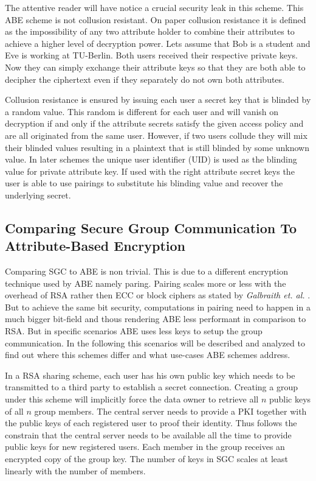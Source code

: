 The attentive reader will have notice a crucial security leak in this scheme. This \ac{ABE} scheme is not collusion resistant. On paper collusion resistance it is defined as the impossibility of any two attribute holder to combine their attributes to achieve a higher level of decryption power. Lets assume that Bob is a student and Eve is working at \ac{TU}-Berlin. Both users received their respective private keys. Now they can simply exchange their attribute keys so that they are both able to decipher the ciphertext even if they separately do not own both attributes.  

Collusion resistance is ensured by issuing each user a secret key that is blinded by a random value. This random is different for each user and will vanish on decryption if and only if the attribute secrets satisfy the given access policy and are all originated from the same user. However, if two users collude they will mix their blinded values resulting in a plaintext that is still blinded by some unknown value. \cite{bethencourt2007ciphertext} In later schemes the unique user identifier (\ac{UID}) is used as the blinding value for private attribute key. \cite{li2017two} If used with the right attribute secret keys the user is able to use pairings to substitute his blinding value and recover the underlying secret. 

\subsection{Comparing Secure Group Communication To Attribute-Based Encryption}
\label{sec:comparing-secure-group-communication-to-attribute-based-encryption}
Comparing \ac{SGC} to \ac{ABE} is non trivial. This is due to a different encryption technique used by \ac{ABE} namely paring. Pairing scales more or less with the overhead of \ac{RSA} rather then \ac{ECC} or block ciphers as stated by \textit{Galbraith et. al.} \cite{galbraith2008pairings}. But to achieve the same bit security, computations in pairing need to happen in a much bigger bit-field and thous rendering \ac{ABE} less performant in comparison to \ac{RSA}. But in specific scenarios \ac{ABE} uses less keys to setup the group communication. In the following this scenarios will be described and analyzed to find out where this schemes differ and what use-cases \ac{ABE} schemes address.

In a \ac{RSA} sharing scheme, each user has his own public key which needs to be transmitted to a third party to establish a secret connection. Creating a group under this scheme will implicitly force the data owner to retrieve all $n$ public keys of all $n$ group members. The central server needs to provide a \ac{PKI} together with the public keys of each registered user to proof their identity. Thus follows the constrain that the central server needs to be available all the time to provide public keys for new registered users. Each member in the group receives an encrypted copy of the group key. The number of keys in \ac{SGC} scales at least linearly with the number of members. 

